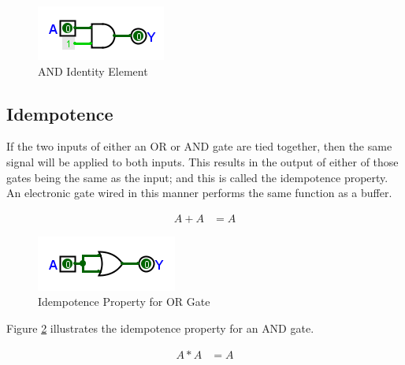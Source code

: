 \begin{figure}[H]
	\centering
	\includegraphics[width=\maxwidth{.95\linewidth}]{gfx/04_11}
	\caption{AND Identity Element}
	\label{fig:04_11}
\end{figure}

\subsection{Idempotence}
\label{BF:subsec:idempotence}

If the two inputs of either an \textsf{OR} or \textsf{AND} gate are tied together, then the same signal will be applied to both inputs. This results in the output of either of those gates being the same as the input; and this is called the idempotence property. An electronic gate wired in this manner performs the same function as a buffer. 


\begin{align}
  \label{BF:eq:idempotence_for_or}
  A + A &= A 
\end{align}

\begin{figure}[H]
	\centering
	\includegraphics[width=\maxwidth{.95\linewidth}]{gfx/04_12}
	\caption{Idempotence Property for OR Gate}
	\label{fig:04_12}
\end{figure}

Figure \ref{fig:04_12} illustrates the idempotence property for an \textsf{AND} gate.


\begin{align}
  \label{BF:eq:idempotence_for_and}
  A * A &= A 
\end{align}

